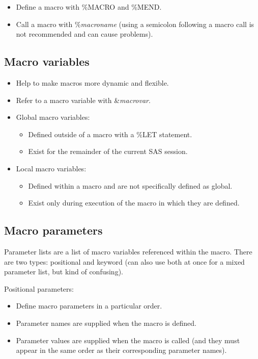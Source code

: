 \documentclass[11pt, oneside]{article}
\begin{document}
\begin{itemize}
\item Define a macro with \%MACRO and \%MEND.
\item Call a macro with \%\textit{macroname} (using a semicolon following a macro call is not recommended and can cause problems).
\end{itemize}


\subsection{Macro variables}

\begin{itemize}
\item Help to make macros more dynamic and flexible.
\item Refer to a macro variable with \&\textit{macrovar}.
\item Global macro variables:
	\begin{itemize}
	\item Defined outside of a macro with a \%LET statement.
	\item Exist for the remainder of the current SAS session.
	\end{itemize}
\item Local macro variables:
	\begin{itemize}
	\item Defined within a macro and are not specifically defined as global.
	\item Exist only during execution of the macro in which they are defined.
	\end{itemize}
\end{itemize}

\subsection{Macro parameters}

Parameter lists are a list of macro variables referenced within the macro. There are two types: positional and keyword (can also use both at once for a mixed parameter list, but kind of confusing).

Positional parameters:
\begin{itemize}
\item Define macro parameters in a particular order.
\item Parameter names are supplied when the macro is defined.
\item Parameter values are supplied when the macro is called (and they must appear in the same order as their corresponding parameter names).
\end{itemize}
\end{document}
